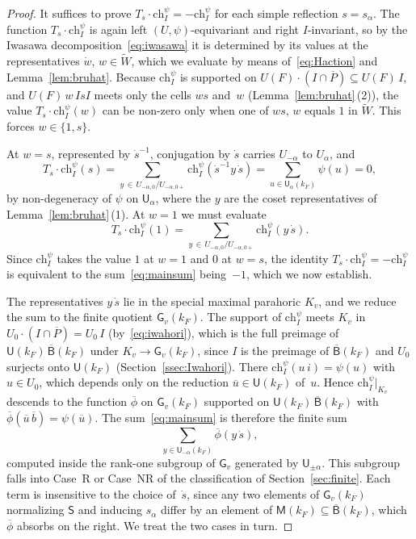 \documentclass[11pt]{amsart}
\theoremstyle{definition}
\theoremstyle{remark}
\newcommand{\barr}[1]{\overline{#1}}
\begin{document}
\begin{proof}
It suffices to prove $T_{s}\cdot\mathrm{ch}_I^\psi = -\mathrm{ch}_I^\psi$ for each simple reflection $s = s_\alpha$. The function $T_{s}\cdot\mathrm{ch}_I^\psi$ is again left $(U,\psi)$-equivariant and right $I$-invariant, so by the Iwasawa decomposition~\eqref{eq:iwasawa} it is determined by its values at the representatives $\dot{w}$, $w\in\widetilde{W}$, which we evaluate by means of~\eqref{eq:Haction} and Lemma~\ref{lem:bruhat}. Because $\mathrm{ch}_I^\psi$ is supported on $U(F)\cdot(I\cap\barr{P})\subseteq U(F)\,I$, and $U(F)\,w\,IsI$ meets only the cells $ws$ and~$w$ (Lemma~\ref{lem:bruhat}\,(2)), the value $T_{s}\cdot\mathrm{ch}_I^\psi(w)$ can be non-zero only when one of $ws,\,w$ equals $1$ in $\widetilde{W}$. This forces $w \in \{1, s\}$.

At $w = s$, represented by $\dot{s}^{-1}$, conjugation by $\dot{s}$ carries $U_{-\alpha}$ to $U_\alpha$, and
\[
T_{s}\cdot\mathrm{ch}_I^\psi(s) = \sum_{y \,\in\, U_{-\alpha,0}/U_{-\alpha,0+}}
\mathrm{ch}_I^\psi(\dot{s}^{-1} y\,\dot{s})
= \sum_{u\in\mathsf{U}_\alpha(k_F)} \psi(u) = 0,
\]
by non-degeneracy of $\psi$ on $\mathsf{U}_\alpha$, where the $y$ are the coset representatives of Lemma~\ref{lem:bruhat}\,(1). At $w = 1$ we must evaluate
\begin{equation}\label{eq:mainsum}
T_{s}\cdot\mathrm{ch}_I^\psi(1) = \sum_{y \,\in\, U_{-\alpha,0}/U_{-\alpha,0+}}
\mathrm{ch}_I^\psi(y\,\dot{s}).
\end{equation}
Since $\mathrm{ch}_I^\psi$ takes the value $1$ at $w = 1$ and $0$ at $w = s$, the identity $T_s\cdot\mathrm{ch}_I^\psi = -\mathrm{ch}_I^\psi$ is equivalent to the sum~\eqref{eq:mainsum} being~$-1$, which we now establish.

The representatives $y\,\dot{s}$ lie in the special maximal parahoric $K_v$, and we reduce the sum to the finite quotient $\mathsf{G}_v(k_F)$. The support of $\mathrm{ch}_I^\psi$ meets $K_v$ in $U_0\cdot(I\cap\barr{P}) = U_0\,I$ (by~\eqref{eq:iwahori}), which is the full preimage of $\mathsf{U}(k_F)\,\barr{\mathsf{B}}(k_F)$ under $K_v \to \mathsf{G}_v(k_F)$, since $I$ is the preimage of $\barr{\mathsf{B}}(k_F)$ and $U_0$ surjects onto $\mathsf{U}(k_F)$ (Section~\ref{ssec:Iwahori}). There $\mathrm{ch}_I^\psi(u\,i) = \psi(u)$ with $u \in U_0$, which depends only on the reduction $\barr{u} \in \mathsf{U}(k_F)$ of~$u$. Hence $\mathrm{ch}_I^\psi|_{K_v}$ descends to the function $\barr{\phi}$ on $\mathsf{G}_v(k_F)$ supported on $\mathsf{U}(k_F)\,\barr{\mathsf{B}}(k_F)$ with $\barr{\phi}(\barr{u}\,\barr{b}) = \psi(\barr{u})$. The sum~\eqref{eq:mainsum} is therefore the finite sum
\[
\sum_{y \in \mathsf{U}_{-\alpha}(k_F)} \barr{\phi}(y\,\dot{s}),
\]
computed inside the rank-one subgroup of $\mathsf{G}_v$ generated by $\mathsf{U}_{\pm\alpha}$. This subgroup falls into Case~R or Case~NR of the classification of Section~\ref{sec:finite}. Each term is insensitive to the choice of~$\dot{s}$, since any two elements of $\mathsf{G}_v(k_F)$ normalizing $\mathsf{S}$ and inducing $s_\alpha$ differ by an element of $\mathsf{M}(k_F) \subseteq \barr{\mathsf{B}}(k_F)$, which $\barr{\phi}$ absorbs on the right. We treat the two cases in turn.


\end{proof}
\end{document}

